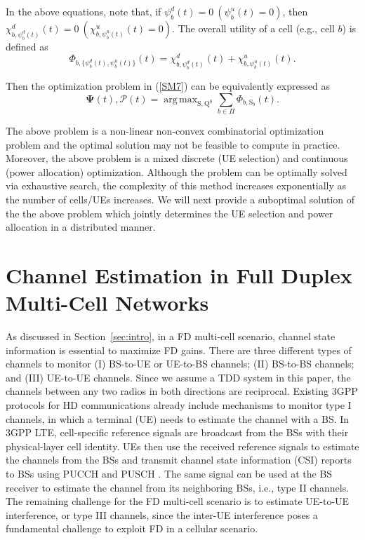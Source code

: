 \documentclass[journal]{IEEEtran}
\DeclareMathOperator*{\argmax}{arg\,max}
\begin{document}
In the above equations, note that, if $\psi_b^d(t) = 0 \ (\psi_b^u(t) = 0)$, then $\chi^d_{b,\psi_b^d(t)}(t) = 0  \ (\chi^u_{b,\psi_b^u(t)}(t) = 0)$. The overall utility of a cell (e.g., cell $b$) is defined as
\begin{equation}\label{SM13}
\Phi_{b,\{\psi_b^d(t),\psi_b^u(t)\}}(t) = \chi^d_{b,\psi_b^d(t)}(t) + \chi^u_{b,\psi_b^u(t)}(t).
\end{equation}

Then the optimization problem in (\ref{SM7}) can be equivalently expressed as
\begin{equation}\label{SM14}
{\boldsymbol{\Psi}(t), \boldsymbol{\mathcal{P}}(t)} = \argmax_{\boldsymbol{\mathrm{S}}, \boldsymbol{\mathrm{Q}}^{\boldsymbol{\mathrm{S}}}} \sum\limits_{b \in \Pi} \Phi_{b, \mathrm{S}_b }(t).
\end{equation}

The above problem is a non-linear non-convex combinatorial optimization problem and the optimal solution may not be feasible to compute in practice. Moreover, the above problem is a mixed discrete (UE selection) and continuous (power allocation) optimization. Although the problem can be optimally solved via exhaustive search, the complexity of this method increases exponentially as the number of cells/UEs increases. We will next provide a suboptimal solution of the the above problem which jointly determines the UE selection and power allocation in a distributed manner. 

\section{Channel Estimation in Full Duplex Multi-Cell Networks}\label{sec:CEP}
As discussed in Section~{\ref{sec:intro}}, in a FD multi-cell scenario, channel state information is essential to maximize FD gains. There are three different types of channels to monitor (I) BS-to-UE or UE-to-BS channels; (II) BS-to-BS channels; and (III) UE-to-UE channels. Since we assume a TDD system in this paper, the channels between any two radios in both directions are reciprocal. Existing 3GPP protocols for HD communications already include mechanisms to monitor type I channels, in which a terminal (UE) needs to estimate the channel with a BS. In 3GPP LTE, cell-specific reference signals are broadcast from the BSs with their physical-layer cell identity. UEs then use the received reference signals to estimate the channels from the BSs and transmit channel state information (CSI) reports to BSs using PUCCH and PUSCH \cite{DahlmanLTE}\cite{3GPP:5}. The same signal can be used at the BS receiver to estimate the channel from its neighboring BSs, i.e., type II channels. The remaining challenge for the FD multi-cell scenario is to estimate UE-to-UE interference, or type III channels, since the inter-UE interference poses a fundamental challenge to exploit FD in a cellular scenario. 
\end{document}
